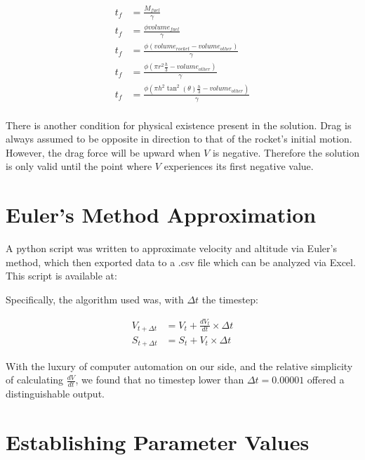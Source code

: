 \documentclass[]{article}
\begin{document}
\begin{center}
	\begin{align*}
	t_f &= \frac{M_{fuel}}{\gamma} \\
	t_f &= \frac{\phi volume_{fuel}}{\gamma} \\
	t_f &= \frac{\phi (volume_{rocket} - volume_{other}) } {\gamma} \\
	t_f &= \frac{\phi (\pi r^2 \frac{h}{3} - volume_{other}) } {\gamma} \\
	t_f &= \frac{\phi (\pi h^2 \tan^2(\theta) \frac{h}{3} - volume_{other}) } {\gamma} \\
	\end{align*}
\end{center}

There is another condition for physical existence present in the solution. Drag is always assumed to be opposite in direction to that of the rocket's initial motion. However, the drag force will be upward when $V$ is negative. Therefore the solution is only valid until the point where $V$ experiences its first negative value.

\section{Euler's Method Approximation}

A python script was written to approximate velocity and altitude via Euler's method, which then exported data to a .csv file which can be analyzed via Excel. This script is available at:


 Specifically, the algorithm used was, with $\Delta t$ the timestep:

\begin{center}
	\begin{align*}
	V_{t+\Delta t} &= V_{t} + \frac{dV_{t}}{dt}\times \Delta t \\
	S_{t+\Delta t} &= S_{t} + V_{t}\times \Delta t
	\end{align*}
\end{center}

With the luxury of computer automation on our side, and the relative simplicity of calculating $\frac{dV}{dt}$, we found that no timestep lower than $\Delta t = 0.00001$ offered a distinguishable output.

\section{Establishing Parameter Values}
\end{document}
